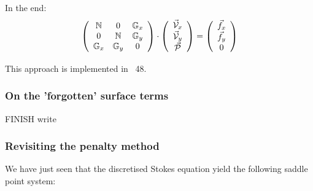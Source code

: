 In the end:
\[
\left(
\begin{array}{ccc}
{{\mathbb{N}}} & 0 & {{\mathbb{G}}}_x  \\
0 & {{\mathbb{N}}} & {{\mathbb{G}}}_y  \\
{\mathbb{G}}_x & {\mathbb{G}}_y & 0 
\end{array}
\right)
\cdot
\left(
\begin{array}{c}
\vec{\cal V}_x \\
\vec{\cal V}_y \\
\vec{\cal P} 
\end{array}
\right)
=
\left(
\begin{array}{c}
\vec{f}_x \\
\vec{f}_y \\
0
\end{array}
\right)
\]

This approach is implemented in \stone~48. 






\subsubsection{On the 'forgotten' surface terms}

FINISH write

\subsubsection{Revisiting the penalty method}

We have just seen that the discretised Stokes equation yield the 
following saddle point system:


